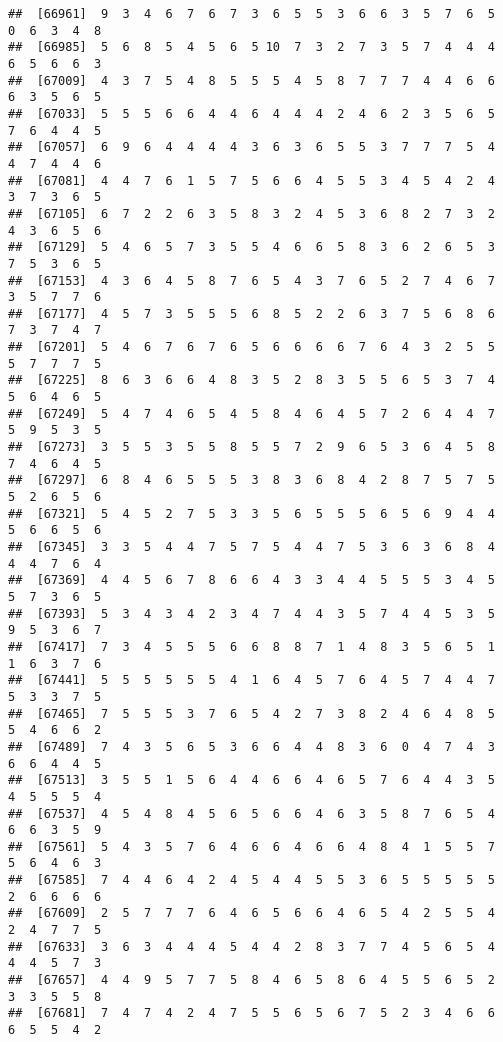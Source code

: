 \documentclass[
]{book}
\begin{document}
\begin{verbatim}
##  [66961]  9  3  4  6  7  6  7  3  6  5  5  3  6  6  3  5  7  6  5  0  6  3  4  8
##  [66985]  5  6  8  5  4  5  6  5 10  7  3  2  7  3  5  7  4  4  4  6  5  6  6  3
##  [67009]  4  3  7  5  4  8  5  5  5  4  5  8  7  7  7  4  4  6  6  6  3  5  6  5
##  [67033]  5  5  5  6  6  4  4  6  4  4  4  2  4  6  2  3  5  6  5  7  6  4  4  5
##  [67057]  6  9  6  4  4  4  4  3  6  3  6  5  5  3  7  7  7  5  4  4  7  4  4  6
##  [67081]  4  4  7  6  1  5  7  5  6  6  4  5  5  3  4  5  4  2  4  3  7  3  6  5
##  [67105]  6  7  2  2  6  3  5  8  3  2  4  5  3  6  8  2  7  3  2  4  3  6  5  6
##  [67129]  5  4  6  5  7  3  5  5  4  6  6  5  8  3  6  2  6  5  3  7  5  3  6  5
##  [67153]  4  3  6  4  5  8  7  6  5  4  3  7  6  5  2  7  4  6  7  3  5  7  7  6
##  [67177]  4  5  7  3  5  5  5  6  8  5  2  2  6  3  7  5  6  8  6  7  3  7  4  7
##  [67201]  5  4  6  7  6  7  6  5  6  6  6  6  7  6  4  3  2  5  5  5  7  7  7  5
##  [67225]  8  6  3  6  6  4  8  3  5  2  8  3  5  5  6  5  3  7  4  5  6  4  6  5
##  [67249]  5  4  7  4  6  5  4  5  8  4  6  4  5  7  2  6  4  4  7  5  9  5  3  5
##  [67273]  3  5  5  3  5  5  8  5  5  7  2  9  6  5  3  6  4  5  8  7  4  6  4  5
##  [67297]  6  8  4  6  5  5  5  3  8  3  6  8  4  2  8  7  5  7  5  5  2  6  5  6
##  [67321]  5  4  5  2  7  5  3  3  5  6  5  5  5  6  5  6  9  4  4  5  6  6  5  6
##  [67345]  3  3  5  4  4  7  5  7  5  4  4  7  5  3  6  3  6  8  4  4  4  7  6  4
##  [67369]  4  4  5  6  7  8  6  6  4  3  3  4  4  5  5  5  3  4  5  5  7  3  6  5
##  [67393]  5  3  4  3  4  2  3  4  7  4  4  3  5  7  4  4  5  3  5  9  5  3  6  7
##  [67417]  7  3  4  5  5  5  6  6  8  8  7  1  4  8  3  5  6  5  1  1  6  3  7  6
##  [67441]  5  5  5  5  5  5  4  1  6  4  5  7  6  4  5  7  4  4  7  5  3  3  7  5
##  [67465]  7  5  5  5  3  7  6  5  4  2  7  3  8  2  4  6  4  8  5  5  4  6  6  2
##  [67489]  7  4  3  5  6  5  3  6  6  4  4  8  3  6  0  4  7  4  3  6  6  4  4  5
##  [67513]  3  5  5  1  5  6  4  4  6  6  4  6  5  7  6  4  4  3  5  4  5  5  5  4
##  [67537]  4  5  4  8  4  5  6  5  6  6  4  6  3  5  8  7  6  5  4  6  6  3  5  9
##  [67561]  5  4  3  5  7  6  4  6  6  4  6  6  4  8  4  1  5  5  7  5  6  4  6  3
##  [67585]  7  4  4  6  4  2  4  5  4  4  5  5  3  6  5  5  5  5  5  2  6  6  6  6
##  [67609]  2  5  7  7  7  6  4  6  5  6  6  4  6  5  4  2  5  5  4  2  4  7  7  5
##  [67633]  3  6  3  4  4  4  5  4  4  2  8  3  7  7  4  5  6  5  4  4  4  5  7  3
##  [67657]  4  4  9  5  7  7  5  8  4  6  5  8  6  4  5  5  6  5  2  3  3  5  5  8
##  [67681]  7  4  7  4  2  4  7  5  5  6  5  6  7  5  2  3  4  6  6  6  5  5  4  2

\end{verbatim}
\end{document}
